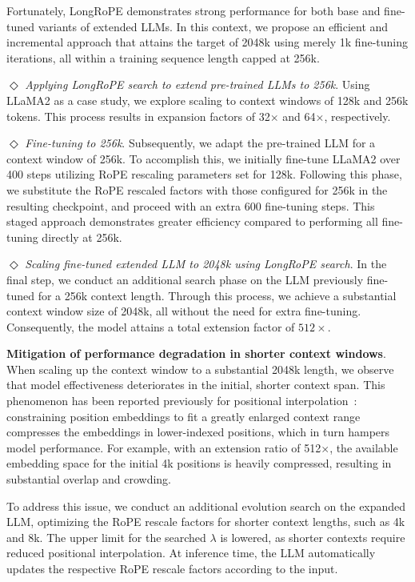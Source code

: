 Fortunately, LongRoPE demonstrates strong performance for both base and fine-tuned variants of extended LLMs. In this context, we propose an efficient and incremental approach that attains the target of 2048k using merely 1k fine-tuning iterations, all within a training sequence length capped at 256k.

$\Diamond$ \textit{Applying LongRoPE search to extend pre-trained LLMs to 256k}. Using LLaMA2 as a case study, we explore scaling to context windows of 128k and 256k tokens. This process results in expansion factors of 32$\times$ and 64$\times$, respectively.

$\Diamond$ \textit{Fine-tuning to 256k}. Subsequently, we adapt the pre-trained LLM for a context window of 256k. To accomplish this, we initially fine-tune LLaMA2 over 400 steps utilizing RoPE rescaling parameters set for 128k. Following this phase, we substitute the RoPE rescaled factors with those configured for 256k in the resulting checkpoint, and proceed with an extra 600 fine-tuning steps. This staged approach demonstrates greater efficiency compared to performing all fine-tuning directly at 256k.

$\Diamond$ \textit{Scaling fine-tuned extended LLM to 2048k using LongRoPE search}. In the final step, we conduct an additional search phase on the LLM previously fine-tuned for a 256k context length. Through this process, we achieve a substantial context window size of 2048k, all without the need for extra fine-tuning. Consequently, the model attains a total extension factor of $512\times$.

\textbf{Mitigation of performance degradation in shorter context windows}.  When scaling up the context window to a substantial 2048k length, we observe that model effectiveness deteriorates in the initial, shorter context span. This phenomenon has been reported previously for positional interpolation~\cite{pi}: constraining position embeddings to fit a greatly enlarged context range compresses the embeddings in lower-indexed positions, which in turn hampers model performance. For example, with an extension ratio of 512$\times$, the available embedding space for the initial 4k positions is heavily compressed, resulting in substantial overlap and crowding.

To address this issue, we conduct an additional evolution search on the expanded LLM, optimizing the RoPE rescale factors for shorter context lengths, such as 4k and 8k. The upper limit for the searched $\lambda$ is lowered, as shorter contexts require reduced positional interpolation. At inference time, the LLM automatically updates the respective RoPE rescale factors according to the input.

